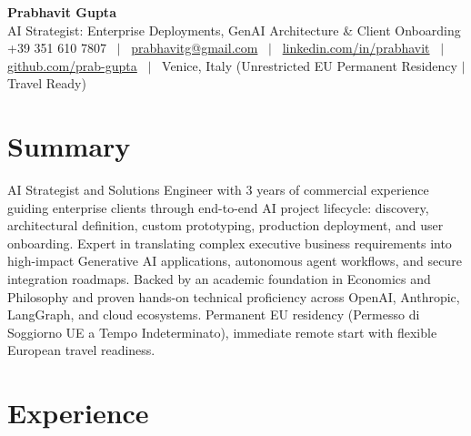 \documentclass[a4paper,10pt]{article}
\begin{document}
\begin{minipage}[c]{0.80\textwidth}
  {\Huge\bfseries Prabhavit Gupta}\\[3pt]
  {\color{accent}\large AI Strategist: Enterprise Deployments, GenAI Architecture \& Client Onboarding}\\[6pt]
  {\footnotesize +39 351 610 7807 ~$\vert$~
  \href{mailto:prabhavitg@gmail.com}{prabhavitg@gmail.com} ~$\vert$~
  \href{https://www.linkedin.com/in/prabhavit/}{linkedin.com/in/prabhavit} ~$\vert$~
  \href{https://github.com/prab-gupta}{github.com/prab-gupta} ~$\vert$~
  Venice, Italy (Unrestricted EU Permanent Residency $\vert$ Travel Ready)}
\end{minipage}\hfill

\section{Summary}
AI Strategist and Solutions Engineer with 3 years of commercial experience guiding enterprise clients through end-to-end AI project lifecycle: discovery, architectural definition, custom prototyping, production deployment, and user onboarding. Expert in translating complex executive business requirements into high-impact Generative AI applications, autonomous agent workflows, and secure integration roadmaps. Backed by an academic foundation in Economics and Philosophy and proven hands-on technical proficiency across OpenAI, Anthropic, LangGraph, and cloud ecosystems. Permanent EU residency (Permesso di Soggiorno UE a Tempo Indeterminato), immediate remote start with flexible European travel readiness.

\section{Experience}
\end{document}
